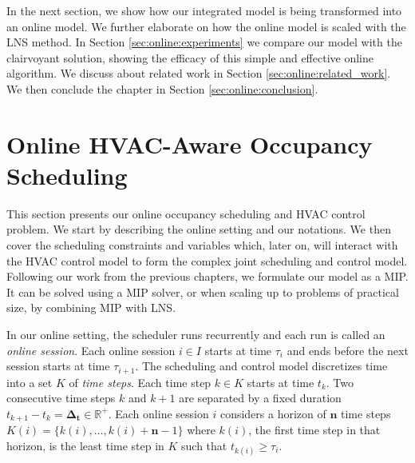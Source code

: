 In the next section, we show how our integrated model is being transformed into an online model. We further elaborate on how the online model is scaled with the LNS method. In Section \ref{sec:online:experiments} we compare our model with the clairvoyant solution, showing the efficacy of this simple and effective online algorithm. We discuss about related work in Section \ref{sec:online:related_work}. We then conclude the chapter %
in Section \ref{sec:online:conclusion}.


\section{Online HVAC-Aware Occupancy Scheduling} \label{sec:online:sche_model}

This section presents our online occupancy scheduling and HVAC control problem. We start by describing the online setting and our notations. We then cover the scheduling constraints and variables which, later on, will interact with the HVAC control model to form the complex joint scheduling and control model. Following our work from the previous chapters, we formulate our model as a MIP. It can be solved using a MIP solver, or when scaling up to problems of practical size, by combining MIP with LNS.

In our online setting, the scheduler runs recurrently and each run is called an \emph{online session}. Each online session $i\in I$ starts at time $\tau_i$ and ends before the next session starts at time $\tau_{i+1}$. The scheduling and control model discretizes time into a set $K$ of {\em time steps}. Each time step $k\in K$ starts at time $t_{k}$. Two consecutive time steps $k$ and $k+1$ are separated by a fixed duration $t_{k+1}-t_{k} = \bm{\Delta_t} \in \mathbb{R}^+$. Each online session $i$ considers a horizon of $\bm{n}$ time steps $K(i) = \{k(i), \ldots, k(i)+\bm{n}-1\}$ where $k(i)$, the first time step in that horizon, is the least time step in $K$ such that $t_{k(i)} \geq \tau_i$. 

